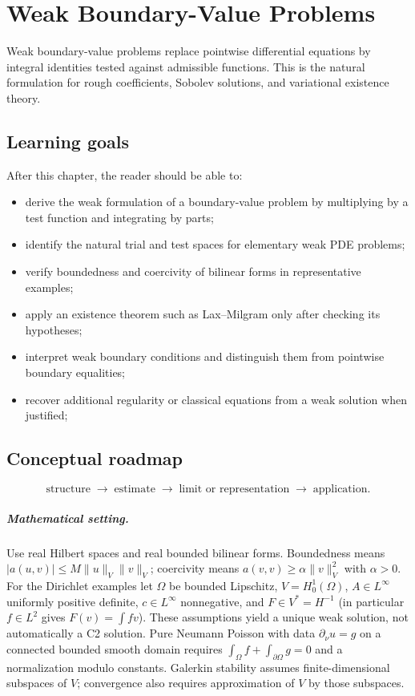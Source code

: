 \chapter{Weak Boundary-Value Problems}
\label{ch:iii23}

Weak boundary-value problems replace pointwise differential equations by integral identities tested against admissible functions. This is the natural formulation for rough coefficients, Sobolev solutions, and variational existence theory.

\section*{Learning goals}
After this chapter, the reader should be able to:
\begin{itemize}
\item derive the weak formulation of a boundary-value problem by multiplying by a test function and integrating by parts;
\item identify the natural trial and test spaces for elementary weak PDE problems;
\item verify boundedness and coercivity of bilinear forms in representative examples;
\item apply an existence theorem such as Lax--Milgram only after checking its hypotheses;
\item interpret weak boundary conditions and distinguish them from pointwise boundary equalities;
\item recover additional regularity or classical equations from a weak solution when justified;
\end{itemize}
\section*{Conceptual roadmap}
\[
\boxed{\text{structure}\;\longrightarrow\;\text{estimate}\;\longrightarrow\;\text{limit or representation}\;\longrightarrow\;\text{application}.}
\]

\paragraph{Mathematical setting.}
Use real Hilbert spaces and real bounded bilinear forms. Boundedness means $|a(u,v)|\le M\|u\|_V\|v\|_V$; coercivity means $a(v,v)\ge\alpha\|v\|_V^2$ with $\alpha>0$. For the Dirichlet examples let $\Omega$ be bounded Lipschitz, $V=H_0^1(\Omega)$, $A\in L^\infty$ uniformly positive definite, $c\in L^\infty$ nonnegative, and $F\in V^*=H^{-1}$ (in particular $f\in L^2$ gives $F(v)=\int fv$). These assumptions yield a unique weak solution, not automatically a C2 solution. Pure Neumann Poisson with data $\partial_\nu u=g$ on a connected bounded smooth domain requires $\int_\Omega f+\int_{\partial\Omega}g=0$ and a normalization modulo constants. Galerkin stability assumes finite-dimensional subspaces of $V$; convergence also requires approximation of $V$ by those subspaces.

